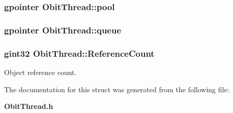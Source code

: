 \subsubsection{\setlength{\rightskip}{0pt plus 5cm}gpointer {\bf Obit\-Thread::pool}}\label{structObitThread_o4}


\subsubsection{\setlength{\rightskip}{0pt plus 5cm}gpointer {\bf Obit\-Thread::queue}}\label{structObitThread_o5}


\subsubsection{\setlength{\rightskip}{0pt plus 5cm}gint32 {\bf Obit\-Thread::Reference\-Count}}\label{structObitThread_o2}


Object reference count. 



The documentation for this struct was generated from the following file:\begin{CompactItemize}
\item 
{\bf Obit\-Thread.h}\end{CompactItemize}
